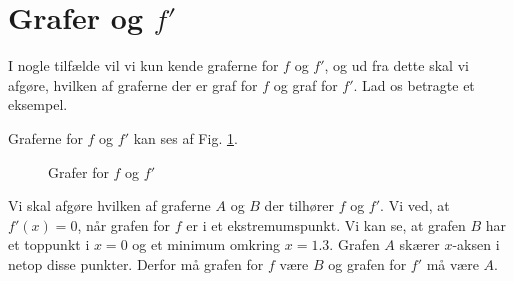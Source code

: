 \section*{Grafer og $f'$}

I nogle tilfælde vil vi kun kende graferne for $f$ og $f'$, og ud fra dette skal vi afgøre, hvilken af graferne der er graf for $f$ og graf for $f'$. Lad os betragte et eksempel.
\begin{exa}
	Graferne for $f$ og $f'$ kan ses af Fig. \ref{fig:grafer}.
	\begin{figure}[H]
		\centering
		\caption{Grafer for $f$ og $f'$}
		\label{fig:grafer}
	\end{figure}
	Vi skal afgøre hvilken af graferne $A$ og $B$ der tilhører $f$ og $f'$. Vi ved, at $f'(x) = 0$, når grafen for $f$ er i et ekstremumspunkt. Vi kan se, at grafen $B$ har et toppunkt i $x=0$ og et 
	minimum omkring $x=1.3$. Grafen $A$ skærer $x$-aksen i netop disse punkter. Derfor må grafen for $f$ være $B$ og grafen for $f'$ må være $A$. 
\end{exa}

